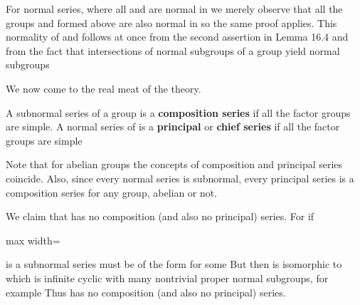 \documentclass[11pt,oneside]{article}
\begin{document}
\begin{BookBody}

For normal series, where all  and  are normal in  we merely observe that all the groups  and  formed above are also normal in  so the same proof applies. This normality of  and  follows at once from the second assertion in Lemma 16.4 and from the fact that intersections of normal subgroups of a group yield normal subgroups\BookEnd{\blacklozenge}


\noindent We now come to the real meat of the theory.

 A subnormal series  of a group  is a\textbf{ composition series} if all the factor groups  are simple. A normal series  of  is a\textbf{ principal} or\textbf{ chief series} if all the factor groups  are simple\BookEnd{\blacksquare}

Note that for abelian groups the concepts of composition and principal series coincide. Also, since every normal series is subnormal, every principal series is a composition series for any group, abelian or not.

 We claim that  has no composition (and also no principal) series. For if

\begin{center}\begin{adjustbox}{max width=\linewidth}\end{adjustbox}\end{center}

\noindent is a subnormal series must be of the form  for some  But then  is isomorphic to  which is infinite cyclic with many nontrivial proper normal subgroups, for example Thus  has no composition (and also no principal) series. \BookEnd{\blacktriangle}


\end{BookBody}
\end{document}
